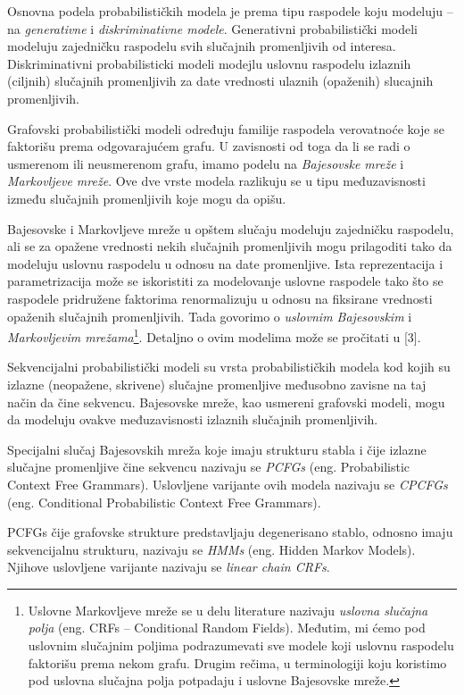 \documentclass[a4paper, 12pt]{article}
\begin{document}
Osnovna podela probabilističkih modela je prema tipu raspodele koju modeluju -- na \textit{generativne} i \textit{diskriminativne modele}. Generativni probabilistički modeli modeluju zajedničku raspodelu svih slučajnih promenljivih od interesa. Diskriminativni probabilisticki modeli modejlu uslovnu raspodelu izlaznih (ciljnih) slučajnih promenljivih za date vrednosti ulaznih (opaženih) slucajnih promenljivih.

Grafovski probabilistički modeli određuju familije raspodela verovatnoće koje se faktorišu prema odgovarajućem grafu. U zavisnosti od toga da li se radi o usmerenom ili neusmerenom grafu, imamo podelu na \textit{Bajesovske mreže} i \textit{Markovljeve mreže}. Ove dve vrste modela razlikuju se u tipu međuzavisnosti između slučajnih promenljivih koje mogu da opišu. 

Bajesovske i Markovljeve mreže u opštem slučaju modeluju zajedničku raspodelu, ali se za opažene vrednosti nekih slučajnih promenljivih mogu prilagoditi tako da modeluju uslovnu raspodelu u odnosu na date promenljive. Ista reprezentacija i parametrizacija može se iskoristiti za modelovanje uslovne raspodele tako što se raspodele pridružene faktorima renormalizuju u odnosu na fiksirane vrednosti opaženih slučajnih promenljivih. Tada govorimo o \textit{uslovnim Bajesovskim} i \textit{Markovljevim mrežama}\footnote{Uslovne Markovljeve mreže se u delu literature nazivaju \textit{uslovna slučajna polja} (eng. CRFs -- Conditional Random Fields). Međutim, mi ćemo pod uslovnim slučajnim poljima podrazumevati sve modele koji uslovnu raspodelu faktorišu prema nekom grafu. Drugim rečima, u terminologiji koju koristimo pod uslovna slučajna polja potpadaju i uslovne Bajesovske mreže.}. Detaljno o ovim modelima može se pročitati u [3].

Sekvencijalni probabilistički modeli su vrsta probabilističkih modela kod kojih su izlazne (neopažene, skrivene) slučajne promenljive međusobno zavisne na taj način da čine sekvencu. Bajesovske mreže, kao usmereni grafovski modeli, mogu da modeluju ovakve međuzavisnosti izlaznih slučajnih promenljivih. 

Specijalni slučaj Bajesovskih mreža koje imaju strukturu stabla i čije izlazne slučajne promenljive čine sekvencu nazivaju se \textit{PCFGs} (eng. Probabilistic Context Free Grammars). Uslovljene varijante ovih modela nazivaju se \textit{CPCFGs} (eng. Conditional Probabilistic Context Free Grammars). 

PCFGs čije grafovske strukture predstavljaju degenerisano stablo, odnosno imaju sekvencijalnu strukturu, nazivaju se \textit{HMMs} (eng. Hidden Markov Models). Njihove uslovljene varijante nazivaju se \textit{linear chain CRFs}.
\end{document}
